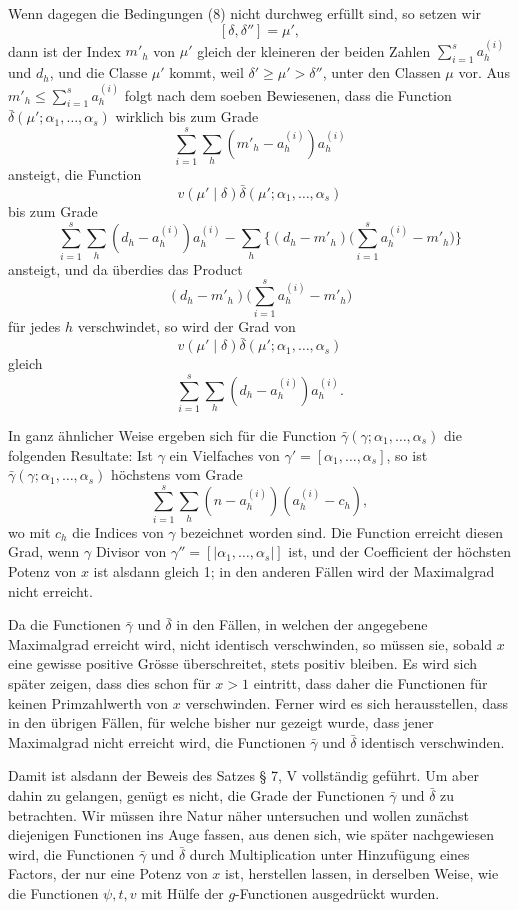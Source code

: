 Wenn dagegen die Bedingungen (8) nicht durchweg erfüllt sind, so setzen wir
\[
 [\delta,\delta'']=\mu',
\]
dann ist der Index $m'_h$ von $\mu'$ gleich der kleineren der beiden Zahlen $\sum_{i=1}^s a_h^{(i)}$ und $d_h$, und die Classe $\mu'$ kommt, weil $\delta'\ge\mu'>\delta''$, unter den Classen $\mu$ vor. Aus $m'_h\le\sum_{i=1}^s a_h^{(i)}$ folgt nach dem soeben Bewiesenen, dass die Function $\bar\delta(\mu';\alpha_1,
\ldots,\alpha_s)$ wirklich bis zum Grade
\[
 \sum_{i=1}^s\sum_h(m'_h-a_h^{(i)})a_h^{(i)}
\]
ansteigt, die Function
\[
 v(\mu'\mid\delta)\bar\delta(\mu';\alpha_1,\ldots,\alpha_s)
\]
bis zum Grade
\[
 \sum_{i=1}^s\sum_h(d_h-a_h^{(i)})a_h^{(i)}
 -\sum_h\biggl\{(d_h-m'_h)\biggl(\sum_{i=1}^s a_h^{(i)}-m'_h\biggr)\biggr\}
\]
ansteigt, und da überdies das Product
\[
 (d_h-m'_h)\biggl(\sum_{i=1}^s a_h^{(i)}-m'_h\biggr)
\]
für jedes $h$ verschwindet, so wird der Grad von
\[
 v(\mu'\mid\delta)\bar\delta(\mu';\alpha_1,
\ldots,\alpha_s)
\]
gleich
\[
 \sum_{i=1}^s\sum_h(d_h-a_h^{(i)})a_h^{(i)}.
\]

In ganz ähnlicher Weise ergeben sich für die Function $\bar\gamma(\gamma;\alpha_1,
\ldots,\alpha_s)$ die folgenden Resultate: Ist $\gamma$ ein Vielfaches von $\gamma'=[\alpha_1,
\ldots,\alpha_s]$, so ist $\bar\gamma(\gamma;\alpha_1,
\ldots,\alpha_s)$ höchstens vom Grade
\begin{equation}
 \sum_{i=1}^s\sum_h(n-a_h^{(i)})(a_h^{(i)}-c_h),
\tag{10}
\end{equation}
wo mit $c_h$ die Indices von $\gamma$ bezeichnet worden sind. Die Function erreicht diesen Grad, wenn $\gamma$ Divisor von $\gamma''=[|\alpha_1,
\ldots,\alpha_s|]$ ist, und der Coefficient der höchsten Potenz von $x$ ist alsdann gleich 1; in den anderen Fällen wird der Maximalgrad nicht erreicht.

Da die Functionen $\bar\gamma$ und $\bar\delta$ in den Fällen, in welchen der angegebene Maximalgrad erreicht wird, nicht identisch verschwinden, so müssen sie, sobald $x$ eine gewisse positive Grösse überschreitet, stets positiv bleiben. Es wird sich später zeigen, dass dies schon für $x>1$ eintritt, dass daher die Functionen für keinen Primzahlwerth von $x$ verschwinden. Ferner wird es sich herausstellen, dass in den übrigen Fällen, für welche bisher nur gezeigt wurde, dass jener Maximalgrad nicht erreicht wird, die Functionen $\bar\gamma$ und $\bar\delta$ identisch verschwinden.

Damit ist alsdann der Beweis des Satzes § 7, V vollständig geführt. Um aber dahin zu gelangen, genügt es nicht, die Grade der Functionen $\bar\gamma$ und $\bar\delta$ zu betrachten. Wir müssen ihre Natur näher untersuchen und wollen zunächst diejenigen Functionen ins Auge fassen, aus denen sich, wie später nachgewiesen wird, die Functionen $\bar\gamma$ und $\bar\delta$ durch Multiplication unter Hinzufügung eines Factors, der nur eine Potenz von $x$ ist, herstellen lassen, in derselben Weise, wie die Functionen $\psi,t,v$ mit Hülfe der $g$-Functionen ausgedrückt wurden.

